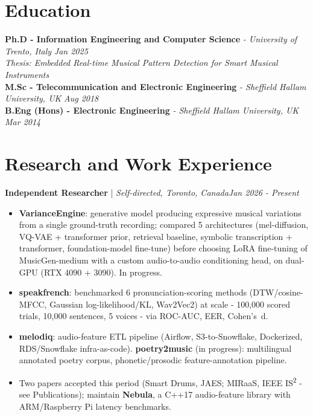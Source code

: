 \documentclass[11pt]{article}
\newenvironment{cvrole}[5]{%
  \par\noindent\textbf{\large #1} | \textit{\small #2, #3}\hfill \textit{\small #4 - #5}\par
  \begin{itemize}[leftmargin=2em, itemsep=-0.3em, topsep=-0.5em]%
}{%
  \end{itemize}\par\noindent\mbox{}\par\vspace{0.1em}%
}
\begin{document}
\section*{Education}
\textbf{Ph.D - Information Engineering and Computer Science} \textit{\small{ - University of Trento, Italy}} \hfill \textit{Jan 2025}\\[2pt]
\noindent\textit{\small Thesis: Embedded Real-time Musical Pattern Detection for Smart Musical Instruments}\\[3pt]
\noindent\textbf{M.Sc - Telecommunication and Electronic Engineering} \textit{\small{ - Sheffield Hallam University, UK}} \hfill \textit{Aug 2018}\\[3pt]
\noindent\textbf{B.Eng (Hons) - Electronic Engineering} \textit{\small{ - Sheffield Hallam University, UK}} \hfill \textit{Mar 2014}

\section*{Research and Work Experience}

\begin{cvrole}{Independent Researcher}{Self-directed}{Toronto, Canada}{Jan 2026}{Present}
    \item \textbf{VarianceEngine}: generative model producing expressive musical variations from a single ground-truth recording; compared 5 architectures (mel-diffusion, VQ-VAE + transformer prior, retrieval baseline, symbolic transcription + transformer, foundation-model fine-tune) before choosing LoRA fine-tuning of MusicGen-medium with a custom audio-to-audio conditioning head, on dual-GPU (RTX 4090 + 3090). In progress.
    \item \textbf{speakfrench}: benchmarked 6 pronunciation-scoring methods (DTW/cosine-MFCC, Gaussian log-likelihood/KL, Wav2Vec2) at scale - 100,000 scored trials, 10,000 sentences, 5 voices - via ROC-AUC, EER, Cohen's~d.
    \item \textbf{melodiq}: audio-feature ETL pipeline (Airflow, S3-to-Snowflake, Dockerized, RDS/Snowflake infra-as-code). \textbf{poetry2music} (in progress): multilingual annotated poetry corpus, phonetic/prosodic feature-annotation pipeline.
    \item Two papers accepted this period (Smart Drums, JAES; MIRaaS, IEEE IS\textsuperscript{2} - see Publications); maintain \textbf{Nebula}, a C++17 audio-feature library with ARM/Raspberry Pi latency benchmarks.
\end{cvrole}
\end{document}
